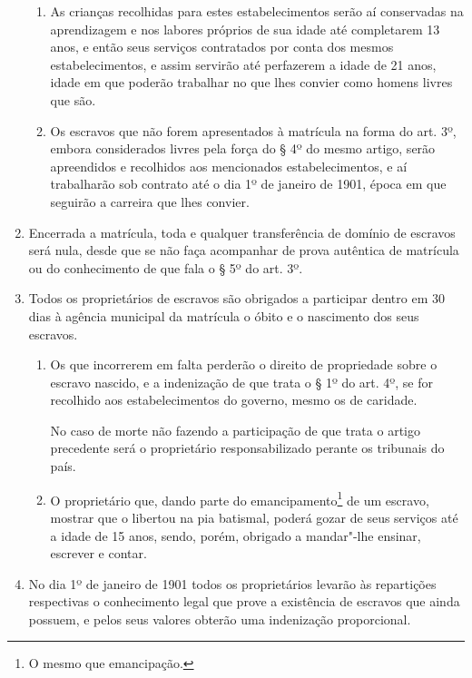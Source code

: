 \begin{enumerate}[label=Art. \arabic*º]
\begin{enumerate}[label=§ \arabic*º]
\item As crianças recolhidas para estes estabelecimentos serão aí
conservadas na aprendizagem e nos labores próprios de sua idade até
completarem 13 anos, e então seus serviços contratados por conta dos
mesmos estabelecimentos, e assim servirão até perfazerem a idade de 21
anos, idade em que poderão trabalhar no que lhes convier como homens
livres que são.

\item Os escravos que não forem apresentados à matrícula na forma do
art. 3º, embora considerados livres pela força do § 4º do mesmo artigo,
serão apreendidos e recolhidos aos mencionados estabelecimentos, e aí
trabalharão sob contrato até o dia 1º de janeiro de 1901, época em que
seguirão a carreira que lhes convier.
\end{enumerate}

\item Encerrada a matrícula, toda e qualquer transferência de domínio
de escravos será nula, desde que se não faça acompanhar de prova
autêntica de matrícula ou do conhecimento de que fala o § 5º do art.
3º.

\item Todos os proprietários de escravos são obrigados a participar
dentro em 30 dias à agência municipal da matrícula o óbito e o
nascimento dos seus escravos.

\begin{enumerate}[label=§ \arabic*º]
\item Os que incorrerem em falta perderão o direito de propriedade sobre
o escravo nascido, e a indenização de que trata o § 1º do art. 4º, se
for recolhido aos estabelecimentos do governo, mesmo os de caridade.

No caso de morte não fazendo a participação de que trata o artigo
precedente será o proprietário responsabilizado perante os tribunais do
país.

\item O proprietário que, dando parte do emancipamento\footnote{O
  mesmo que emancipação.} de um escravo, mostrar que o libertou na pia
batismal, poderá gozar de seus serviços até a idade de 15 anos, sendo,
porém, obrigado a mandar"-lhe ensinar, escrever e contar.
\end{enumerate}

\item No dia 1º de janeiro de 1901 todos os proprietários levarão às
repartições respectivas o conhecimento legal que prove a existência de
escravos que ainda possuem, e pelos seus valores obterão uma indenização
proporcional.


\end{enumerate}
